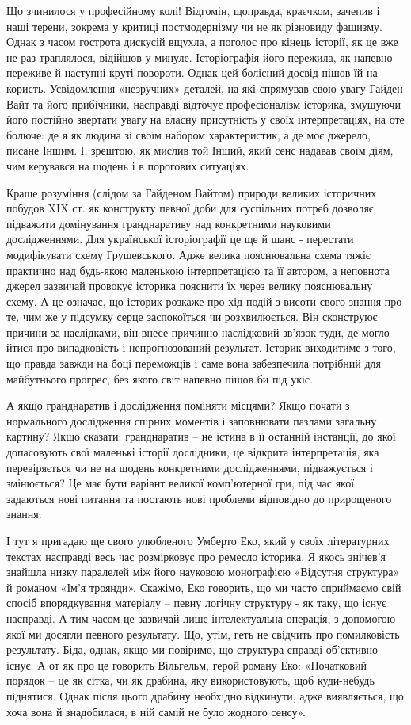 Що зчинилося у професійному колі! Відгомін, щоправда, краєчком, зачепив і наші
терени, зокрема у критиці постмодернізму чи не як різновиду фашизму. Однак з
часом гострота дискусій вщухла, а поголос про кінець історії, як це вже не раз
траплялося, відійшов у минуле. Історіографія його пережила, як напевно переживе
й наступні круті повороти. Однак цей болісний досвід пішов їй на користь.
Усвідомлення «незручних» деталей, на які спрямував свою увагу Гайден Вайт та
його прибічники, насправді відточує професіоналізм історика, змушуючи його
постійно звертати увагу на власну присутність у своїх інтерпретаціях, на оте
болюче: де я як людина зі своїм набором характеристик, а де моє джерело, писане
Іншим. І, зрештою, як мислив той Інший, який сенс надавав своїм діям, чим
керувався на щодень і в порогових ситуаціях.

Краще розуміння (слідом за Гайденом Вайтом) природи великих історичних побудов
XIX ст. як конструкту певної доби для суспільних потреб дозволяє підважити
домінування гранднаративу над конкретними науковими дослідженнями. Для
української історіографії це ще й шанс - перестати модифікувати схему
Грушевського. Адже велика пояснювальна схема тяжіє практично над будь-якою
маленькою інтерпретацією та її автором, а неповнота джерел зазвичай провокує
історика пояснити їх через велику пояснювальну схему. А це означає, що історик
розкаже про хід подій з висоти свого знання про те, чим же у підсумку серце
заспокоїться чи розхвилюється. Він сконструює причини за наслідками, він внесе
причинно-наслідковий зв’язок туди, де могло йтися про випадковість і
непрогнозований результат. Історик виходитиме з того, що правда завжди на боці
переможців і саме вона забезпечила потрібний для майбутнього прогрес, без якого
світ напевно пішов би під укіс. 

А якщо гранднаратив і дослідження поміняти місцями? Якщо почати з нормального
дослідження спірних моментів і заповнювати пазлами загальну картину? Якщо
сказати: гранднаратив – не істина в її останній інстанції, до якої допасовують
свої маленькі історії дослідники, це відкрита інтерпретація, яка перевіряється
чи не на щодень конкретними дослідженнями, підважується і змінюється? Це має
бути варіант великої комп’ютерної гри, під час якої задаються нові питання та
постають нові проблеми відповідно до прирощеного знання.

І тут я пригадаю ще свого улюбленого Умберто Еко, який у своїх літературних
текстах насправді весь час розмірковує про ремесло історика. Я якось знічев’я
знайшла низку паралелей між його науковою монографією «Відсутня структура» й
романом «Ім’я троянди». Скажімо, Еко говорить, що ми часто сприймаємо свій
спосіб впорядкування матеріалу – певну логічну структуру - як таку, що існує
насправді. А тим часом це зазвичай лише інтелектуальна операція, з допомогою
якої ми досягли певного результату. Що, утім, геть не свідчить про помилковість
результату. Біда, однак, якщо ми повіримо, що структура справді об’єктивно
існує. А от як про це говорить Вільгельм, герой роману Еко: «Початковий порядок
– це як сітка, чи як драбина, яку використовують, щоб куди-небудь піднятися.
Однак після цього драбину необхідно відкинути, адже виявляється, що хоча вона й
знадобилася, в ній самій не було жодного сенсу». 

